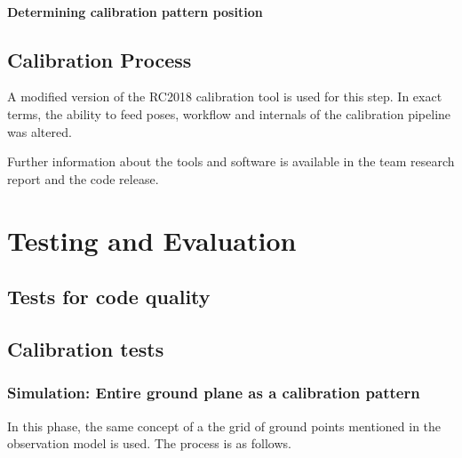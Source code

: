 \documentclass[english, printversion, nomenclature, notitle]{tuvisionthesis} %
\begin{document}

\subsubsection{Determining calibration pattern position}

\section{Calibration Process}
A modified version of the RC2018 calibration tool is used for this step. In exact terms, the ability to feed poses, workflow and internals of the calibration pipeline was altered.

Further information about the tools and software is available in the team research report and the code release. 


\chapter{Testing and Evaluation}
\section{Tests for code quality}
\section{Calibration tests}
\subsection{Simulation: Entire ground plane as a calibration pattern}
\label{subsec:simGroundTest}
In this phase, the same concept of a the grid of ground points mentioned in the observation model is used. The process is as follows.
\end{document}
